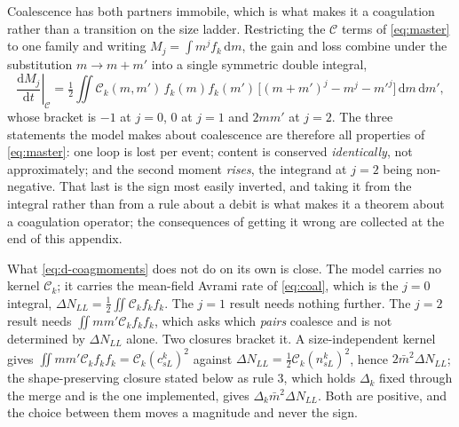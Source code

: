 Coalescence has both partners immobile, which is what makes it a coagulation
rather than a transition on the size ladder. Restricting the $\mathcal C$ terms
of \cref{eq:master} to one family and writing $M_j=\int m^{j}f_k\,\mathrm dm$,
the gain and loss combine under the substitution $m\to m+m'$ into a single
symmetric double integral,
\begin{equation}
  \left.\frac{\mathrm dM_j}{\mathrm dt}\right|_{\mathcal C}
  =\tfrac12\!\iint\!\mathcal C_k(m,m')\,f_k(m)f_k(m')\,
    \bigl[(m+m')^{j}-m^{j}-m'^{j}\bigr]\,\mathrm dm\,\mathrm dm' ,
  \label{eq:d-coagmoments}
\end{equation}
whose bracket is $-1$ at $j=0$, $0$ at $j=1$ and $2mm'$ at $j=2$. The three
statements the model makes about coalescence are therefore all properties of
\cref{eq:master}: one loop is lost per event; content is conserved
\emph{identically}, not approximately; and the second moment \emph{rises}, the
integrand at $j=2$ being non-negative. That last is the sign most easily
inverted, and taking it from the integral rather than from a rule about a debit
is what makes it a theorem about a coagulation operator; the consequences of
getting it wrong are collected at the end of this appendix.

What \cref{eq:d-coagmoments} does not do on its own is close. The model carries
no kernel $\mathcal C_k$; it carries the mean-field Avrami rate of
\cref{eq:coal}, which is the $j=0$ integral,
$\Delta N_{LL}=\tfrac12\iint\mathcal C_kf_kf_k$. The $j=1$ result needs nothing
further. The $j=2$ result needs $\iint mm'\mathcal C_kf_kf_k$, which asks which
\emph{pairs} coalesce and is not determined by $\Delta N_{LL}$ alone. Two
closures bracket it. A size-independent kernel gives
$\iint mm'\mathcal C_kf_kf_k=\mathcal C_k(c^k_{sL})^{2}$ against
$\Delta N_{LL}=\tfrac12\mathcal C_k(n^k_{sL})^{2}$, hence
$2\bar m^{2}\Delta N_{LL}$; the shape-preserving closure stated below as rule
3, which holds $\Delta_k$ fixed through the merge and is the one implemented, gives
$\Delta_k\bar m^{2}\Delta N_{LL}$. Both are positive, and the choice between
them moves a magnitude and never the sign.

